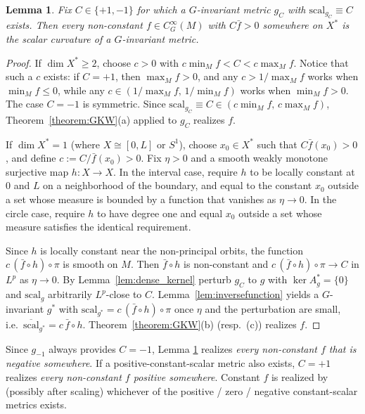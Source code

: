 \documentclass[12pt,a4paper]{amsart}
\theoremstyle{plain}
\newtheorem{lemma}[theorem]{Lemma}
\theoremstyle{definition}
\theoremstyle{remark}
\newcommand{\ga}{\mathit{g}} %
\begin{document}
\begin{lemma}\label{lem:realization}
    Fix $C\in\{+1,-1\}$ for which a $G$-invariant metric
$\ga_C$ with $\mathrm{scal}_{\ga_C}\equiv C$ exists. Then every non-constant $f\in C^\infty_G(M)$ with
$C\bar f>0$ somewhere on $X^*$ is the scalar curvature of a $G$-invariant metric.
\end{lemma}
\begin{proof}
If $\dim X^*\ge2$, choose $c>0$ with $c\min_M f<C<c\max_M f$. Notice that such a $c$ exists:
if $C=+1$, then $\max_M f>0$, and any $c>1/\max_M f$ works when $\min_M f\le 0$, while
any $c\in(1/\max_M f,\,1/\min_M f)$ works when $\min_M f>0$. The case $C=-1$ is symmetric. Since
$\mathrm{scal}_{\ga_C}\equiv C\in(c\min_M f,\,c\max_M f)$, Theorem~\ref{theorem:GKW}(a) applied
to $\ga_C$ realizes $f$.

If $\dim X^*=1$ (where $X\cong[0, L]$ or $S^1$), choose $x_0\in X^*$ such that $C\bar f(x_0)>0$,
and define $c:=C/\bar f(x_0)>0$. Fix $\eta>0$ and a smooth weakly monotone surjective map
$h\colon X\to X$. In the interval case, require $h$ to be locally constant at $0$ and $L$ on a
neighborhood of the boundary, and equal to the constant $x_0$ outside a set whose measure
is bounded by a function that vanishes as $\eta \to 0$. In the circle case, require $h$ to have degree one and equal $x_0$ outside a set whose measure satisfies the identical requirement.

Since $h$ is locally constant near the non-principal orbits, the function
$c\,(\bar f\circ h)\circ\pi$ is smooth on $M$. Then
$\bar f\circ h$ is non-constant and $c\,(\bar f\circ h)\circ\pi\to C$ in $L^p$ as $\eta\to0$. By
Lemma~\ref{lem:dense_kernel} perturb $\ga_C$ to $\ga$ with $\ker A^*_\ga=\{0\}$ and $\mathrm{scal}_\ga$
arbitrarily $L^p$-close to $C$. Lemma~\ref{lem:inversefunction} yields a $G$-invariant
$\ga^*$ with $\mathrm{scal}_{\ga^*}=c\,(\bar f\circ h)\circ\pi$ once $\eta$ and the perturbation are small,
i.e.\ $\overline{\mathrm{scal}}_{\ga^*}=c\,\bar f\circ h$. Theorem~\ref{theorem:GKW}(b) (resp.\ (c))
realizes $f$. 
\end{proof}

\smallskip
\noindent Since $\ga_{-1}$ always provides $C=-1$, Lemma \ref{lem:realization} realizes \emph{every
non-constant $f$ that is negative somewhere}. If a positive-constant-scalar metric also exists,
$C=+1$ realizes \emph{every non-constant $f$ positive somewhere}. Constant $f$ is realized by (possibly after scaling)
whichever of the positive / zero / negative constant-scalar metrics exists.
\end{document}

